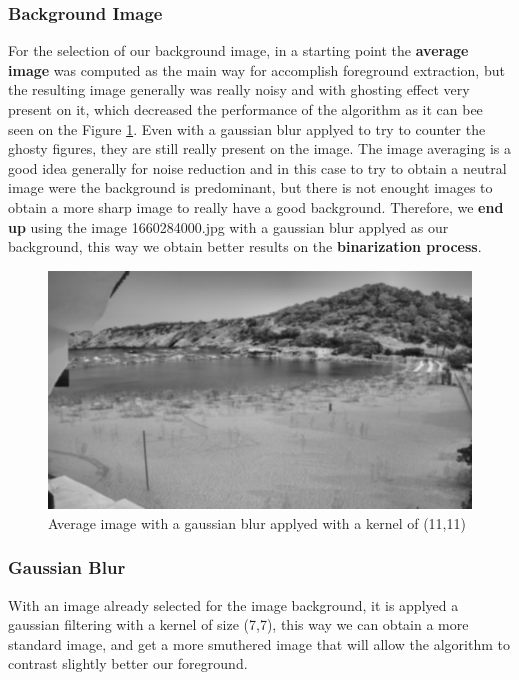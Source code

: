 \documentclass[10pt]{article}
\begin{document}
\subsubsection*{Background Image}

For the selection of our background image, in a starting point the \textbf{average image} was computed as the main way for accomplish foreground extraction, but the resulting image generally was really noisy and with ghosting effect very present on it, which decreased the performance of the algorithm as it can bee seen on the Figure \ref{fig:avg}. Even with a gaussian blur applyed to try to counter the ghosty figures, they are still really present on the image. The image averaging is a good idea generally for noise reduction and in this case to try to obtain a neutral image were the background is predominant, but there is not enought images to obtain a more sharp image to really have a good background. Therefore, we \textbf{end up} using the image 1660284000.jpg with a gaussian blur applyed as our background, this way we obtain better results on the \textbf{binarization process}.

\begin{figure}[htb]
    \centering
    \includegraphics[width=\textwidth]{img/avg.png}
    \caption{Average image with a gaussian blur applyed with a kernel of (11,11)}
    \label{fig:avg}
\end{figure}

\subsubsection*{Gaussian Blur}
With an image already selected for the image background, it is applyed a gaussian filtering with a kernel of size (7,7), this way  we can obtain a more standard image, and get a more smuthered image that will allow the algorithm to contrast slightly better our foreground.\newline
\end{document}
